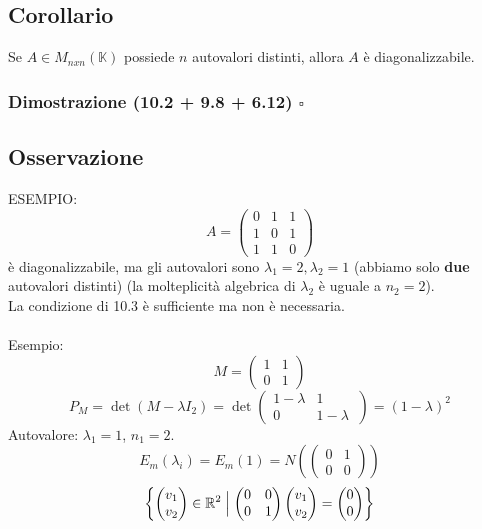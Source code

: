 \documentclass[12pt]{article}
\begin{document}
\subsection{Corollario}

Se $A \in M_{nxn}(\mathbb{K})$ possiede $n$ autovalori distinti, allora $A$ è diagonalizzabile.

\subsubsection{Dimostrazione (10.2 + 9.8 + 6.12) $\square$}

\subsection{Osservazione}

ESEMPIO:
\[A = \begin{pmatrix}
    0 & 1 & 1\\
    1 & 0 & 1\\
    1 & 1 & 0
\end{pmatrix}\]
è diagonalizzabile, ma gli autovalori sono $\lambda_1 = 2, \lambda_ 2 = 1$ (abbiamo solo \textbf{due} autovalori distinti) (la molteplicità algebrica di $\lambda_ 2$ è uguale a $n_2 = 2$).\\
La condizione di 10.3 è sufficiente ma non è necessaria.
\\\\
Esempio:
\[M = \begin{pmatrix}
    1 & 1\\
    0 & 1
\end{pmatrix}\]
\[P_M = \det{(M - \lambda I_2)} = \det{\begin{pmatrix}
    1-\lambda & 1\\
    0 & 1-\lambda\
\end{pmatrix}} = (1-\lambda)^2\]
Autovalore: $\lambda_1 = 1$, $n_1 = 2$.
\[E_m(\lambda_i) = E_m(1) = N\left(\begin{pmatrix}
    0 & 1\\
    0 & 0
\end{pmatrix}\right)\]
\[\left\{\begin{pmatrix}
    v_1\\
    v_2
\end{pmatrix} \in \mathbb{R}^2 \Bigm\vert \begin{pmatrix}
    0 & 0\\
    0 & 1
\end{pmatrix}\begin{pmatrix}
    v_1\\
    v_2
\end{pmatrix} = \begin{pmatrix}
    0\\
    0
\end{pmatrix}\right\}\]
\end{document}
